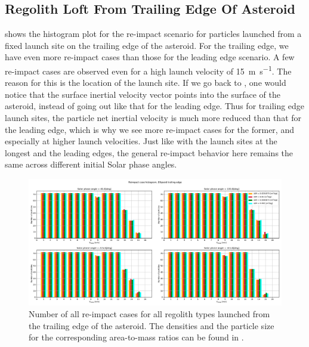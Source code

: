 \subsection{Regolith Loft From Trailing Edge Of Asteroid}
\label{sec:general_char_trailingEdge}
 shows the histogram plot for the re-impact scenario for particles launched from a fixed launch site on the trailing edge of the asteroid. For the trailing edge, we have even more re-impact cases than those for the leading edge scenario. A few re-impact cases are observed even for a high launch velocity of \SI{15}{\metre\per\second}. The reason for this is the location of the launch site. If we go back to , one would notice that the surface inertial velocity vector points into the surface of the asteroid, instead of going out like that for the leading edge. Thus for trailing edge launch sites, the particle net inertial velocity is much more reduced than that for the leading edge, which is why we see more re-impact cases for the former, and especially at higher launch velocities. Just like with the launch sites at the longest and the leading edges, the general re-impact behavior here remains the same across different initial Solar phase angles.
\begin{figure}[!h]
\centering
\captionsetup{justification=centering}
\includegraphics[angle=90, width=\textwidth, height=\textheight, keepaspectratio=true]{trailing_edge_perturbations/allReimpactCases.pdf}
\caption{Number of all re-impact cases for all regolith types launched from the trailing edge of the asteroid. The densities and the particle size for the corresponding area-to-mass ratios can be found in .}
\label{fig:trailingEdge_allParticles_reimpact_hist}
\end{figure}
\FloatBarrier
